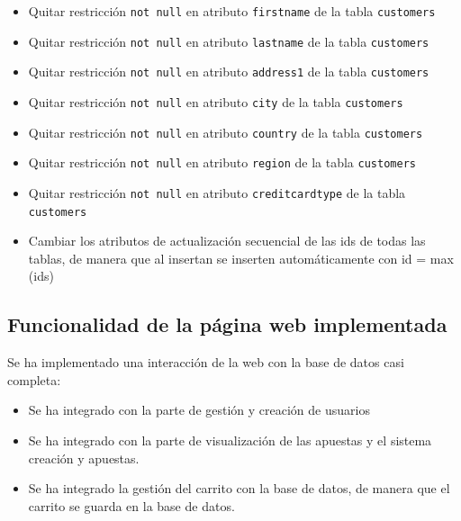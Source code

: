 \documentclass{article}
\begin{document}
\begin{itemize}
\item Quitar restricción \texttt{not null} en atributo \texttt{firstname} de la tabla \texttt{customers} 
\item Quitar restricción \texttt{not null} en atributo \texttt{lastname} de la tabla \texttt{customers} 
\item Quitar restricción \texttt{not null} en atributo \texttt{address1} de la tabla \texttt{customers} 
\item Quitar restricción \texttt{not null} en atributo \texttt{city} de la tabla \texttt{customers} 
\item Quitar restricción \texttt{not null} en atributo \texttt{country} de la tabla \texttt{customers} 
\item Quitar restricción \texttt{not null} en atributo \texttt{region} de la tabla \texttt{customers} 
\item Quitar restricción \texttt{not null} en atributo \texttt{creditcardtype} de la tabla \texttt{customers} 
\item Cambiar los atributos de actualización secuencial de las ids de todas las tablas, de manera que al insertan se inserten automáticamente con id = max (ids)
\end{itemize}

\subsection{Funcionalidad de la página web implementada}

Se ha implementado una interacción de la web con la base de datos casi completa:
\begin{itemize}
\item Se ha integrado con la parte de gestión y creación de usuarios
\item Se ha integrado con la parte de visualización de las apuestas y el sistema creación y apuestas.
\item Se ha integrado la gestión del carrito con la base de datos, de manera que el carrito se guarda en la base de datos.
\end{itemize}
\end{document}
